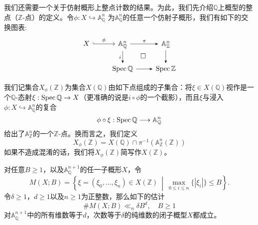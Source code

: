 我们还需要一个关于仿射概形上整点计数的结果。为此，我们先介绍$\mathbb{Q}$上概型的整点（$\mathbb{Z}$-点）的定义。令$\phi: X \hookrightarrow \mathbb{A}^n_{\mathbb{Q}}$ 为$\mathbb{A}^n_{\mathbb{Q}}$的任意一个仿射子概形，我们有如下的交换图表:
\begin{equation}
\begin{tikzcd}[arrows = {-Stealth}]
X \arrow[r, hookrightarrow, "\phi"] & \mathbb{A}^n_{\mathbb{Q}} \arrow[r, "\pi"] \arrow[d, "i"'] \arrow[dr, phantom, "\square"] & \mathbb{A}^n_{\mathbb{Z}} \arrow[d] \\
& \spec\mathbb{Q} \arrow[r] & \spec\mathbb{Z}
\end{tikzcd}
\end{equation}
\begin{definition} \label{Z-point of a Q-scheme}
我们记集合$X_{\phi}(\mathbb{Z})$为集合$X(\mathbb{Q})$由如下点组成的子集合：将$\xi \in X(\mathbb{Q})$视作是一个$\mathbb{Q}$-态射$\xi: \operatorname{Spec}\mathbb{Q}\to X$（更准确的说是$i\circ\phi$的一个截影），而且$\xi$与浸入$\phi: X \hookrightarrow \mathbb{A}^n_{\mathbb{Q}}$的复合
\begin{equation}
\phi\circ\xi: \operatorname{Spec}\mathbb{Q} \longrightarrow \mathbb{A}^n_{\mathbb{Q}}
\end{equation}
给出了$\mathbb{A}^n_{\mathbb{Z}}$的一个$\mathbb{Z}$-点。换而言之，我们定义
\begin{equation}
X_{\phi}(\mathbb{Z}) = X(\mathbb{Q}) \cap \pi^{-1}(\mathbb{A}^n_{\mathbb{Z}}(\mathbb{Z}))
\end{equation}
如果不造成混淆的话，我们将$X_{\phi}(\mathbb{Z})$简写作$X(\mathbb{Z})$。
\end{definition}

\begin{lemma} \label{affine cone lemma}
对任意$B \geqslant 1$，以及$\mathbb{A}^{n+1}_{\mathbb{Q}}$的任一子概形$X$，令
\begin{equation}
\label{M(X;B)}
M(X;B) = \left\{ \xi = (\xi_0,\ldots,\xi_n) \in X(\mathbb{Z}) \ \middle|\ \max_{0 \leqslant i \leqslant n} \{|\xi_i|\} \leqslant B \right\}.
\end{equation}
令$\delta \geqslant 1$，$d \geqslant 1$以及$n \geqslant 1$为正整数，那么如下的估计
\begin{equation} \label{estimate of M(X;B)}
\#M(X;B) \ll_{n} \delta B^{d}, \quad B \geqslant 1
\end{equation}
对$\mathbb{A}^{n+1}_{\mathbb{Q}}$中的所有维数等于$d$，次数等于$\delta$的纯维数的闭子概型$X$都成立。
\end{lemma}

